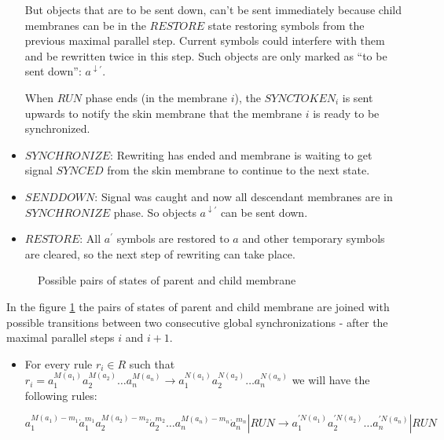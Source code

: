 \begin{dokaz}
\begin{itemize}
    But objects that are to be sent down, can't be sent immediately because child membranes can be in the $RESTORE$ state restoring symbols from the previous maximal parallel step. Current symbols could interfere with them and be rewritten twice in this step. Such objects are only marked as ``to be sent down'': $a^{\downarrow\prime}$.

    When $RUN$ phase ends (in the membrane $i$), the $SYNCTOKEN_i$ is sent upwards to notify the skin membrane that the membrane $i$ is ready to be synchronized.

    \item $SYNCHRONIZE$: Rewriting has ended and membrane is waiting to get signal $SYNCED$ from the skin membrane to continue to the next state.

    \item $SENDDOWN$: Signal was caught and now all descendant membranes are in $SYNCHRONIZE$ phase. So objects $a^{\downarrow\prime}$ can be sent down.

    \item $RESTORE$: All $a^{\prime}$ symbols are restored to $a$ and other temporary symbols are cleared, so the next step of rewriting can take place.
  \end{itemize}

  \begin{figure}
    \def\svgwidth{\textwidth}
    
    \caption{Possible pairs of states of parent and child membrane}
    \label{fig:possible_pairs_of_states_of_parent_and_child_membrane}
  \end{figure}

  In the figure \ref{fig:possible_pairs_of_states_of_parent_and_child_membrane} the pairs of states of parent and child membrane are joined with possible transitions between two consecutive global synchronizations - after the maximal parallel steps $i$ and $i+1$.
  


  \begin{itemize}
    \item For every rule $r_i\in R$ such that $r_i = a_1^{M(a_1)}a_2^{M(a_2)}\dots a_n^{M(a_n)} \rightarrow a_1^{N(a_1)}a_2^{N(a_2)}\dots a_n^{N(a_n)}$ we will have the following rules:
  
    $a_1^{M(a_1)-m_1}\dot{a}_1^{m_1}a_2^{M(a_2)-m_2}\dot{a}_2^{m_2}\dots a_n^{M(a_n)-m_n}\dot{a}_n^{m_n}|RUN \rightarrow a_1^{\prime N(a_1)}a_2^{\prime N(a_2)}\dots a_n^{\prime N(a_n)}|RUN$


\end{itemize}
\end{dokaz}
